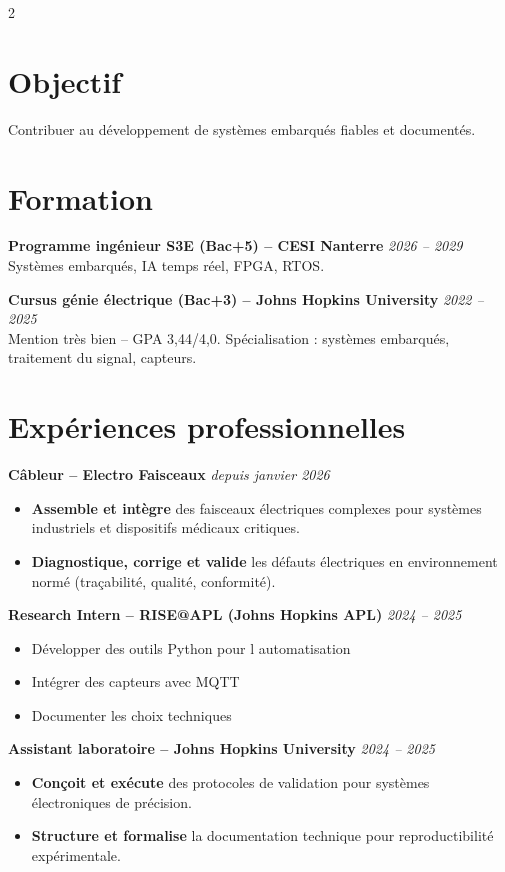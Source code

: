 \documentclass[10pt,a4paper]{article}
\begin{document}
\begin{multicols}{2}

\section*{Objectif}
Contribuer au développement de systèmes embarqués fiables et documentés.

\section*{Formation}
\textbf{Programme ingénieur S3E (Bac+5) – CESI Nanterre} \hfill \textit{2026 – 2029} \\
Systèmes embarqués, IA temps réel, FPGA, RTOS.

\textbf{Cursus génie électrique (Bac+3) – Johns Hopkins University} \hfill \textit{2022 – 2025} \\
Mention très bien – GPA 3,44/4,0. Spécialisation : systèmes embarqués, traitement du signal, capteurs.


\section*{Expériences professionnelles}
\textbf{Câbleur – Electro Faisceaux} \hfill \textit{depuis janvier 2026}
\begin{itemize}[leftmargin=*]
    \item \textbf{Assemble et intègre} des faisceaux électriques complexes pour systèmes industriels et dispositifs médicaux critiques.
    \item \textbf{Diagnostique, corrige et valide} les défauts électriques en environnement normé (traçabilité, qualité, conformité).
\end{itemize}

\textbf{Research Intern – RISE@APL (Johns Hopkins APL)} \hfill \textit{2024 – 2025}
\begin{itemize}[leftmargin=*]
    \item Développer des outils Python pour l automatisation
    \item Intégrer des capteurs avec MQTT
    \item Documenter les choix techniques
\end{itemize}

\textbf{Assistant laboratoire – Johns Hopkins University} \hfill \textit{2024 – 2025}
\begin{itemize}[leftmargin=*]
    \item \textbf{Conçoit et exécute} des protocoles de validation pour systèmes électroniques de précision.
    \item \textbf{Structure et formalise} la documentation technique pour reproductibilité expérimentale.
\end{itemize}


\end{multicols}
\end{document}
